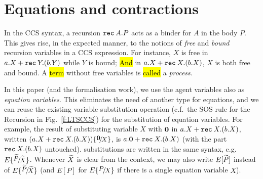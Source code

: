 \section{Equations and contractions}
\label{s:eq}

In the CCS syntax, 
a recursion ${\tt rec}\: A . P$ acts as a binder for $A$ in the body $P$. 
This gives rise, in the expected manner, to the notions of 
\emph{free} and \emph{bound} recursion variables in a CCS expression. 
For instance,  $X$ is free in $a.X + {\tt rec}\: Y . (b.Y)$ while $Y$
is bound; \hl{And} in $a.X + {\tt rec}\: X . (b.X)$, $X$ is both free and bound.
A \hl{term} without free variables is \hl{called} a \emph{process}.

In this paper (and the formalisation work), we use the agent
variables also as \emph{equation variables}. This eliminates the need of
another type for  equations, and we can reuse the existing
variable substitution operation (c.f.\ the   SOS rule for the Recursion in
Fig.~\ref{f:LTSCCS}) for the substitution of equation variables.
For example, the result of substituting variable $X$ with ${\boldsymbol 0}$ in $a.X +
{\tt rec}\: X . (b.X)$,  written $(a.X + \recu X (b.X)) \sub {\nil} X$, is
$a.{\boldsymbol 0} + {\tt rec}\: X . (b.X)$ (with the part ${\tt rec}\: X . (b.X)$
untouched). \Multivariate substitutions are written in the same syntax,
e.g. $E \sub {\til P} {\til X}$. Whenever $\widetilde X$ is clear from the
context, we may also write $E[\widetilde P]$ instead of $E \sub {\til P} {\til
  X}$ (and $E[P]$ for $E \sub P X$ if there is a single equation
variable $X$). 

 
